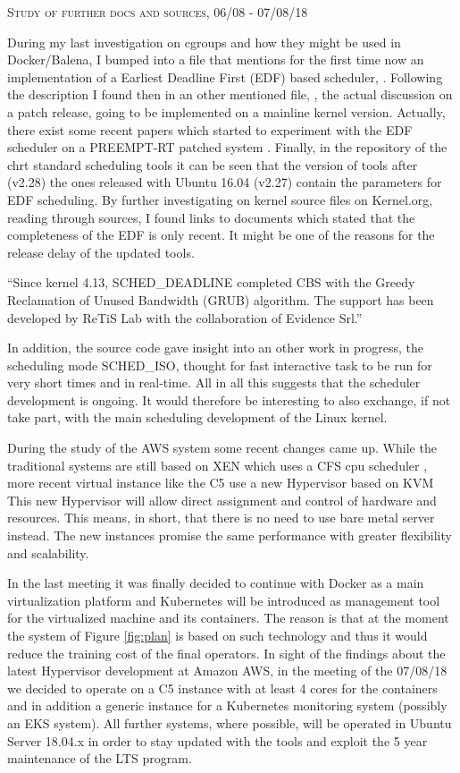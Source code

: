 \documentclass[]{scrartcl}
\begin{document}
{\small\textsc{Study of further docs and sources, 06/08 - 07/08/18} \bigskip}

During my last investigation on cgroups and how they might be used in Docker/Balena, I bumped into a file that mentions for the first time now an implementation of a Earliest Deadline First (EDF) based scheduler, \cite{kernel01}.
Following the description I found then in an other mentioned file,
\cite{kernel02}, the actual discussion on a patch release, going to be implemented on a mainline kernel version. Actually, there exist some recent papers which started to experiment with the EDF scheduler on a PREEMPT-RT patched system \cite{Buelnaetal2017}.
Finally, in the repository of the chrt standard scheduling tools \cite{schtools01} it can be seen that the version of tools after (v2.28) the ones released with Ubuntu 16.04 (v2.27) contain the parameters for EDF scheduling.
By further investigating on kernel source files on Kernel.org, reading through sources, I found links to documents \cite{wiki01} which stated that the completeness of the EDF is only recent.
It might be one of the reasons for the release delay of the updated tools.
\bigskip

``Since kernel 4.13, SCHED\_DEADLINE completed CBS with the Greedy Reclamation of Unused Bandwidth (GRUB) algorithm. The support has been developed by ReTiS Lab with the collaboration of Evidence Srl.''
\bigskip

In addition, the source code gave insight into an other work in progress, the scheduling mode SCHED\_ISO, thought for fast interactive task to be run for very short times and in real-time. All in all this suggests that the scheduler development is ongoing. It would therefore be interesting to also exchange, if not take part, with the main scheduling development of the Linux kernel.

During the study of the AWS system some recent changes came up. While the traditional systems are still based on XEN which uses a CFS cpu scheduler \cite{xen01}, more recent virtual instance like the C5 use a new Hypervisor based on KVM \cite{amazon01} 
This new Hypervisor will allow direct assignment and control of hardware and resources.
This means, in short, that there is no need to use bare metal server instead. The new instances promise the same performance with greater flexibility and scalability.

In the last meeting it was finally decided to continue with Docker as a main virtualization platform and Kubernetes will be introduced as management tool for the virtualized machine and its containers. The reason is that at the moment the system of Figure \ref{fig:plan} is based on such technology and thus it would reduce the training cost of the final operators. In sight of the findings about the latest Hypervisor development at Amazon AWS, in the meeting of the 07/08/18 we decided to operate on a C5 instance with at least 4 cores for the containers and in addition a generic instance for a Kubernetes monitoring system (possibly an EKS system). All further systems, where possible, will be operated in Ubuntu Server 18.04.x in order to stay updated with the tools and exploit the 5 year maintenance of the LTS program.
\end{document}
